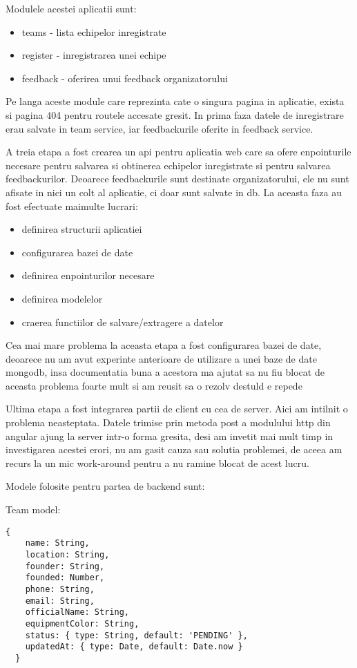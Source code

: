 Modulele acestei aplicatii sunt:
\begin{itemize}
	\item teams - lista echipelor inregistrate
	\item register - inregistrarea unei echipe
	\item feedback - oferirea unui feedback organizatorului
\end{itemize}

Pe langa aceste module care reprezinta cate o singura pagina in aplicatie, exista si pagina 404 pentru routele accesate gresit. In prima faza datele de inregistrare erau salvate in team service, iar feedbackurile oferite in feedback service.

A treia etapa a fost crearea un api pentru aplicatia web care sa ofere enpointurile necesare pentru salvarea si obtinerea echipelor inregistrate si pentru salvarea feedbackurilor. Deoarece feedbackurile sunt destinate organizatorului, ele nu sunt afisate in nici un colt al aplicatie, ci doar sunt salvate in db. La aceasta faza au fost efectuate maimulte lucrari: 
\begin{itemize}
	\item definirea structurii aplicatiei
	\item configurarea bazei de date
	\item definirea enpointurilor necesare
	\item definirea modelelor
	\item craerea functiilor de salvare/extragere a datelor
\end{itemize}

Cea mai mare problema la aceasta etapa a fost configurarea bazei de date, deoarece nu am avut experinte anterioare de utilizare a unei baze de date mongodb, insa documentatia buna a acestora ma ajutat sa nu fiu blocat de aceasta problema foarte mult si am reusit sa o rezolv destuld e repede

Ultima etapa a fost integrarea partii de client cu cea de server. Aici am intilnit o problema neasteptata. Datele trimise prin metoda post a modulului http din angular ajung la server intr-o forma gresita, desi am invetit mai mult timp in investigarea acestei erori, nu am gasit cauza sau solutia problemei, de aceea am recurs la un mic work-around pentru a nu ramine blocat de acest lucru. 

Modele folosite pentru partea de backend sunt:

Team model:
\begin{lstlisting}
{
    name: String,
    location: String,
    founder: String,
    founded: Number,
    phone: String,
    email: String,
    officialName: String,
    equipmentColor: String,
    status: { type: String, default: 'PENDING' },
    updatedAt: { type: Date, default: Date.now }
  }
  \end{lstlisting}
  
